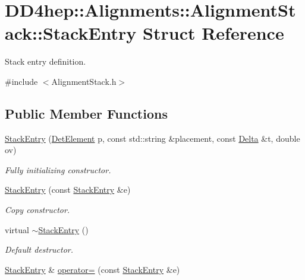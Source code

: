 \hypertarget{struct_d_d4hep_1_1_alignments_1_1_alignment_stack_1_1_stack_entry}{
\section{DD4hep::Alignments::AlignmentStack::StackEntry Struct Reference}
\label{struct_d_d4hep_1_1_alignments_1_1_alignment_stack_1_1_stack_entry}
}


Stack entry definition.  


{\ttfamily \#include $<$AlignmentStack.h$>$}\subsection*{Public Member Functions}
\begin{DoxyCompactItemize}
\item 
\hyperlink{struct_d_d4hep_1_1_alignments_1_1_alignment_stack_1_1_stack_entry_ab70af826b6e4ccdfccf5b0ba45914fae}{StackEntry} (\hyperlink{namespace_d_d4hep_a21dd977310ff183f61ca6ae14b59a989}{DetElement} p, const std::string \&placement, const \hyperlink{class_d_d4hep_1_1_alignments_1_1_delta}{Delta} \&t, double ov)
\begin{DoxyCompactList}\small\item\em Fully initializing constructor. \item\end{DoxyCompactList}\item 
\hyperlink{struct_d_d4hep_1_1_alignments_1_1_alignment_stack_1_1_stack_entry_a9c332ece4923052e68db8d9ff9b2e72a}{StackEntry} (const \hyperlink{struct_d_d4hep_1_1_alignments_1_1_alignment_stack_1_1_stack_entry}{StackEntry} \&e)
\begin{DoxyCompactList}\small\item\em Copy constructor. \item\end{DoxyCompactList}\item 
virtual \hyperlink{struct_d_d4hep_1_1_alignments_1_1_alignment_stack_1_1_stack_entry_ae652df4f6d2a322e1e3ec6b023782b0f}{$\sim$StackEntry} ()
\begin{DoxyCompactList}\small\item\em Default destructor. \item\end{DoxyCompactList}\item 
\hyperlink{struct_d_d4hep_1_1_alignments_1_1_alignment_stack_1_1_stack_entry}{StackEntry} \& \hyperlink{struct_d_d4hep_1_1_alignments_1_1_alignment_stack_1_1_stack_entry_ac970428872fc608121623bdb91ebc8ec}{operator=} (const \hyperlink{struct_d_d4hep_1_1_alignments_1_1_alignment_stack_1_1_stack_entry}{StackEntry} \&e)

\end{DoxyCompactItemize}
